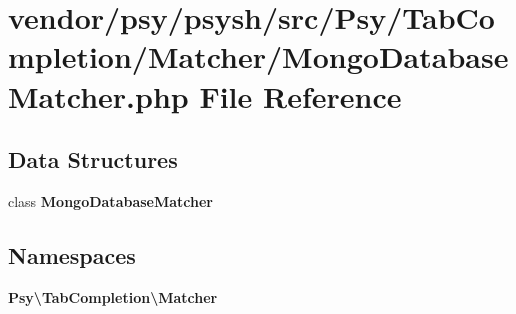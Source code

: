 \section{vendor/psy/psysh/src/\+Psy/\+Tab\+Completion/\+Matcher/\+Mongo\+Database\+Matcher.php File Reference}
\label{_mongo_database_matcher_8php}
\subsection*{Data Structures}
\begin{DoxyCompactItemize}
\item 
class {\bf Mongo\+Database\+Matcher}
\end{DoxyCompactItemize}
\subsection*{Namespaces}
\begin{DoxyCompactItemize}
\item 
 {\bf Psy\textbackslash{}\+Tab\+Completion\textbackslash{}\+Matcher}
\end{DoxyCompactItemize}
